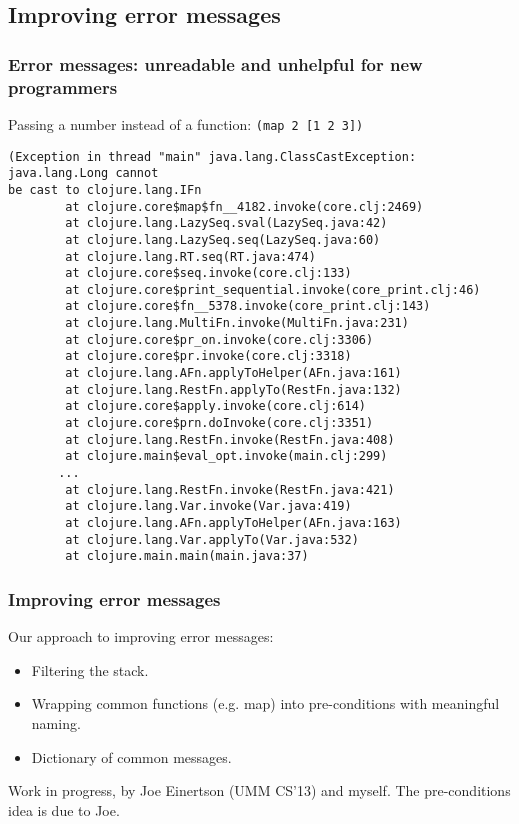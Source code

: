 \documentclass{beamer}
\begin{document}
\subsection{Improving error messages}

\begin{frame}[fragile]
  \frametitle{Error messages: unreadable and unhelpful for new programmers}
Passing a number instead of a function: {\tt (map 2 [1 2 3])}
{\tiny
\begin{verbatim}
(Exception in thread "main" java.lang.ClassCastException: java.lang.Long cannot
be cast to clojure.lang.IFn
        at clojure.core$map$fn__4182.invoke(core.clj:2469)
        at clojure.lang.LazySeq.sval(LazySeq.java:42)
        at clojure.lang.LazySeq.seq(LazySeq.java:60)
        at clojure.lang.RT.seq(RT.java:474)
        at clojure.core$seq.invoke(core.clj:133)
        at clojure.core$print_sequential.invoke(core_print.clj:46)
        at clojure.core$fn__5378.invoke(core_print.clj:143)
        at clojure.lang.MultiFn.invoke(MultiFn.java:231)
        at clojure.core$pr_on.invoke(core.clj:3306)
        at clojure.core$pr.invoke(core.clj:3318)
        at clojure.lang.AFn.applyToHelper(AFn.java:161)
        at clojure.lang.RestFn.applyTo(RestFn.java:132)
        at clojure.core$apply.invoke(core.clj:614)
        at clojure.core$prn.doInvoke(core.clj:3351)
        at clojure.lang.RestFn.invoke(RestFn.java:408)
        at clojure.main$eval_opt.invoke(main.clj:299)
       ...
        at clojure.lang.RestFn.invoke(RestFn.java:421)
        at clojure.lang.Var.invoke(Var.java:419)
        at clojure.lang.AFn.applyToHelper(AFn.java:163)
        at clojure.lang.Var.applyTo(Var.java:532)
        at clojure.main.main(main.java:37)
\end{verbatim}
}
\end{frame}

\begin{frame}
  \frametitle{Improving error messages}
Our approach to improving error messages:
\begin{itemize}
\item Filtering the stack. 
\item Wrapping common functions (e.g. map) into pre-conditions with meaningful naming. 
\item Dictionary of common messages.
\end{itemize}
Work in progress, by Joe Einertson (UMM CS'13) and myself. The pre-conditions idea is due to Joe. 
\end{frame}
\end{document}
